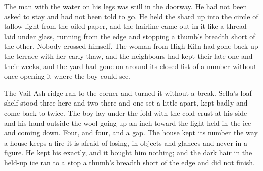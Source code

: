 The man with the water on his legs was still in the doorway. He had not been asked to stay and had not been told to go. He held the shard up into the circle of tallow light from the oiled paper, and the hairline came out in it like a thread laid under glass, running from the edge and stopping a thumb's breadth short of the other. Nobody crossed himself. The woman from High Kiln had gone back up the terrace with her early thaw, and the neighbours had kept their late one and their weeks, and the yard had gone on around its closed fist of a number without once opening it where the boy could see.

The Vail Ash ridge ran to the corner and turned it without a break. Sella's loaf shelf stood three here and two there and one set a little apart, kept badly and come back to twice. The boy lay under the fold with the cold crust at his side and his hand outside the wool going up an inch toward the light held in the ice and coming down. Four, and four, and a gap. The house kept its number the way a house keeps a fire it is afraid of losing, in objects and glances and never in a figure. He kept his exactly, and it bought him nothing; and the dark hair in the held-up ice ran to a stop a thumb's breadth short of the edge and did not finish.
